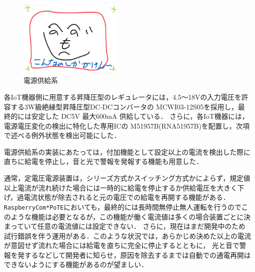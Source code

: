 \vspace{-1zh}
\begin{figure}[H]
\centering
\includegraphics[width=5cm]{figspics/henoheno.jpeg}
\caption{電源供給系}
\label{hohno:RaspberryComPoTE-Po1}
\end{figure}
\vspace{-1zh}

各IoT機器側に用意する昇降圧型のレギュレータには，4.5〜18Vの入力電圧を許容する3W級絶縁型昇降圧型DC-DCコンバータの MCWI03-12S05\cite{data:MCWI03-12S05}を採用し，最終的には安定した DC5V 最大600mA 供給している．
さらに，各IoT機器には，電源電圧変化の検出に特化した専用ICの M51957B(RNA51957B)\cite{data:M51957B}を配置し，次項で述べる例外状態を検出可能にした．






電源供給系の実装にあたっては，付加機能として設定以上の電流を検出した際に直ちに給電を停止し，音と光で警報を発報する機能も用意した．

通常，定電圧電源装置は，シリーズ方式かスイッチング方式かによらず，規定値以上電流が流れ続けた場合には一時的に給電を停止するか供給電圧を大きく下げ，過電流状態が除去されると元の電圧での給電を再開する機能がある．
{\tt Raspberry\-Com*PoTE}においても，最終的には長時間無停止無人運転を行うのでこのような機能は必要となるが，この機能が働く電流値は多くの場合装置ごとに決まっていて任意の電流値には設定できない．
さらに，現在はまだ開発中のため試行錯誤を伴う運用がある．このような状況では，あらかじめ決めた以上の電流が意図せず流れた場合には給電を直ちに完全に停止するとともに，
光と音で警報を発するなどして開発者に知らせ，原因を除去するまでは自動での通電再開はできないようにする機能があるのが望ましい．

